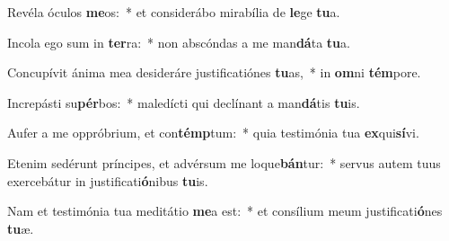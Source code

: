 \item Revéla óculos \textbf{me}os:~* et considerábo mirabília de \textbf{le}ge \textbf{tu}a.
\item Incola ego sum in \textbf{ter}ra:~* non abscóndas a me man\textbf{dá}ta \textbf{tu}a.
\item Concupívit ánima mea desideráre justificatiónes \textbf{tu}as,~* in \textbf{om}ni \textbf{tém}pore.
\item Increpásti su\textbf{pér}bos:~* maledícti qui declínant a man\textbf{dá}tis \textbf{tu}is.
\item Aufer a me oppróbrium, et con\textbf{témp}tum:~* quia testimónia tua \textbf{ex}qui\textbf{sí}vi.
\item Etenim sedérunt príncipes, et advérsum me loque\textbf{bán}tur:~* servus autem tuus exercebátur in justificati\textbf{ó}nibus \textbf{tu}is.
\item Nam et testimónia tua meditátio \textbf{me}a est:~* et consílium meum justificati\textbf{ó}nes \textbf{tu}æ.
